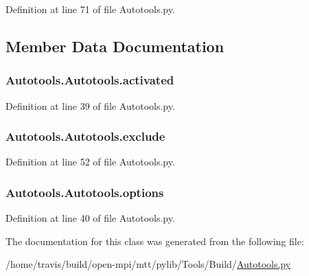 Definition at line 71 of file Autotools.\-py.



\subsection{Member Data Documentation}
\hypertarget{class_autotools_1_1_autotools_a6bbb714a91bc8b6fe749326772b073b3}{
\subsubsection[{activated}]{\setlength{\rightskip}{0pt plus 5cm}Autotools.\-Autotools.\-activated}}\label{class_autotools_1_1_autotools_a6bbb714a91bc8b6fe749326772b073b3}


Definition at line 39 of file Autotools.\-py.

\hypertarget{class_autotools_1_1_autotools_aee37d9789ea22ee310ebc357cd721b7f}{
\subsubsection[{exclude}]{\setlength{\rightskip}{0pt plus 5cm}Autotools.\-Autotools.\-exclude}}\label{class_autotools_1_1_autotools_aee37d9789ea22ee310ebc357cd721b7f}


Definition at line 52 of file Autotools.\-py.

\hypertarget{class_autotools_1_1_autotools_a8b348e19f0a7104bde9c43c3a6ed695d}{
\subsubsection[{options}]{\setlength{\rightskip}{0pt plus 5cm}Autotools.\-Autotools.\-options}}\label{class_autotools_1_1_autotools_a8b348e19f0a7104bde9c43c3a6ed695d}


Definition at line 40 of file Autotools.\-py.



The documentation for this class was generated from the following file\-:\begin{DoxyCompactItemize}
\item 
/home/travis/build/open-\/mpi/mtt/pylib/\-Tools/\-Build/\hyperlink{_autotools_8py}{Autotools.\-py}\end{DoxyCompactItemize}

